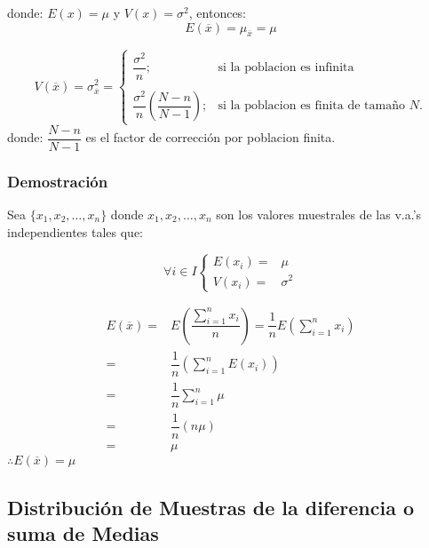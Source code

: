 donde: $E(x) = \mu$ y $V(x) =\sigma^2$, entonces:
$$E(\overline{x}) = \mu_{\overline{x}} = \mu$$

$$
V(\overline{x}) = \sigma^2_{\overline{x}}= 
\begin{cases}
\dfrac{\sigma^2}{n} ;&\text{si la poblacion es infinita}\\
& \\
\dfrac{\sigma^2}{n}\left(\dfrac{N-n}{N-1}\right) ;& \text{si la poblacion es finita de tamaño $N$.}
\end{cases}
$$
donde: $\dfrac{N-n}{N-1}$ es el factor de corrección por poblacion finita.
\subsubsection{Demostración}
Sea $\{x_1,x_2,\ldots,x_n\}$ donde $x_1,x_2,\ldots,x_n$ son los valores muestrales de las v.a.'s independientes tales que:

$$ \forall i\in I
\begin{cases}
E(x_i) =&\mu \\
V(x_i) =&\sigma^2
\end{cases}
$$

\begin{align*}
E(\overline{x}) =& E\left(\dfrac{\displaystyle\sum_{i=1}^{n} x_i}{n}\right) = \dfrac{1}{n}E\left(  \displaystyle\sum_{i=1}^{n} x_i \right) \\
=& \dfrac{1}{n} \left(  \displaystyle\sum_{i=1}^{n} E(x_i) \right) \\ 
=& \dfrac{1}{n}\displaystyle\sum_{i=1}^{n} \mu \\
=& \dfrac{1}{n} (n\mu) \\
=& \mu
\end{align*}
$\therefore E(\overline{x}) = \mu$
\subsection{Distribución de Muestras de la diferencia o suma de Medias}

